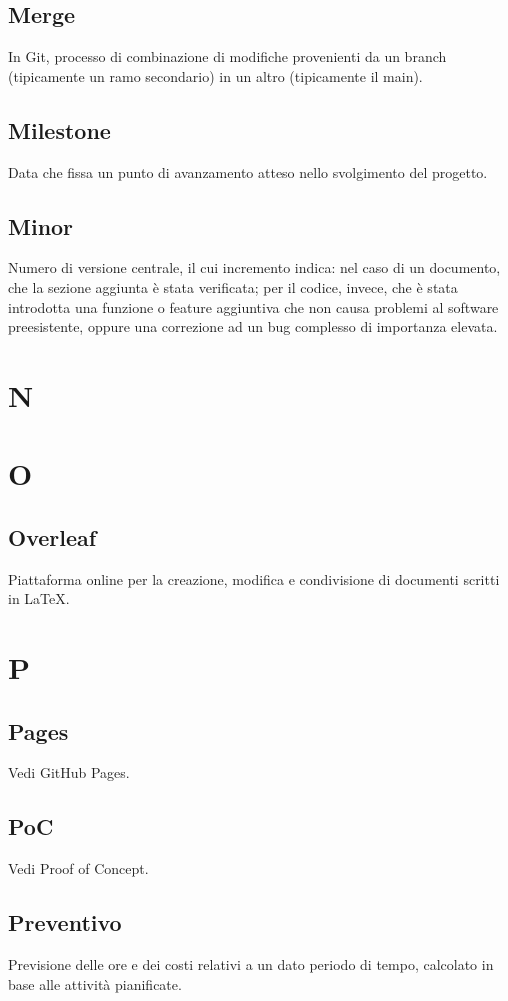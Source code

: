     \subsection{Merge}
    In Git, processo di combinazione di modifiche provenienti da un branch (tipicamente 
    un ramo secondario) in un altro (tipicamente il main).
    \subsection{Milestone}
    Data che fissa un punto di avanzamento atteso nello svolgimento del progetto.
    \subsection{Minor}
    Numero di versione centrale, il cui incremento indica: nel caso di un documento, che la sezione aggiunta è stata verificata; per il codice, invece, che è stata
    introdotta una funzione o feature aggiuntiva che non causa problemi al software preesistente, oppure una correzione ad un bug complesso di importanza elevata.

\section{N}
\section{O}
    \subsection{Overleaf}
    Piattaforma online per la creazione, modifica e condivisione di documenti 
    scritti in LaTeX.
\section{P}
    \subsection{Pages}
    Vedi GitHub Pages.
    \subsection{PoC}
    Vedi Proof of Concept.
    \subsection{Preventivo}
    Previsione delle ore e dei costi relativi a un dato periodo di tempo,
    calcolato in base alle attività pianificate.
